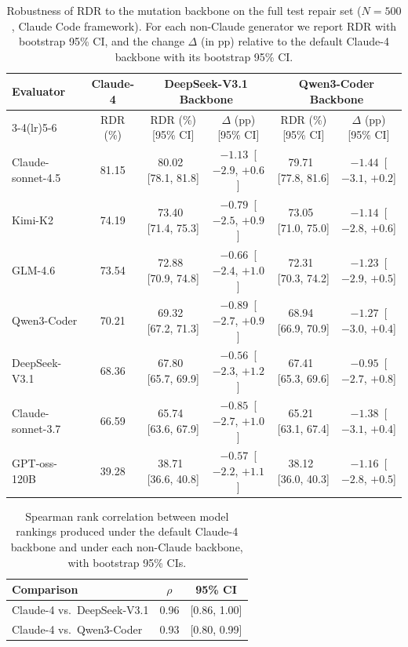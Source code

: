 \documentclass[11pt]{article}
\begin{document}
\begin{table}[h]
  \centering
  \small
  \renewcommand{\arraystretch}{1.15}
  \setlength{\tabcolsep}{5pt}
  \caption{
    Robustness of RDR to the mutation backbone on the full test repair set ($N{=}500$, Claude Code framework). For each non-Claude generator we report RDR with bootstrap 95\% CI, and the change $\Delta$ (in pp) relative to the default Claude-4 backbone with its bootstrap 95\% CI.
  }
  \begin{tabular}{l c cc cc}
    \toprule
    \multirow{2}{*}{Evaluator} & Claude-4 & \multicolumn{2}{c}{DeepSeek-V3.1 Backbone} & \multicolumn{2}{c}{Qwen3-Coder Backbone} \\
    \cmidrule(lr){3-4}\cmidrule(lr){5-6}
     & RDR (\%) & RDR (\%) [95\% CI] & $\Delta$ (pp) [95\% CI] & RDR (\%) [95\% CI] & $\Delta$ (pp) [95\% CI] \\
    \midrule
    Claude-sonnet-4.5 & 81.15 & 80.02 \,[78.1, 81.8] & $-1.13$ \,[$-2.9$, $+0.6$] & 79.71 \,[77.8, 81.6] & $-1.44$ \,[$-3.1$, $+0.2$] \\
    Kimi-K2           & 74.19 & 73.40 \,[71.4, 75.3] & $-0.79$ \,[$-2.5$, $+0.9$] & 73.05 \,[71.0, 75.0] & $-1.14$ \,[$-2.8$, $+0.6$] \\
    GLM-4.6           & 73.54 & 72.88 \,[70.9, 74.8] & $-0.66$ \,[$-2.4$, $+1.0$] & 72.31 \,[70.3, 74.2] & $-1.23$ \,[$-2.9$, $+0.5$] \\
    Qwen3-Coder       & 70.21 & 69.32 \,[67.2, 71.3] & $-0.89$ \,[$-2.7$, $+0.9$] & 68.94 \,[66.9, 70.9] & $-1.27$ \,[$-3.0$, $+0.4$] \\
    DeepSeek-V3.1     & 68.36 & 67.80 \,[65.7, 69.9] & $-0.56$ \,[$-2.3$, $+1.2$] & 67.41 \,[65.3, 69.6] & $-0.95$ \,[$-2.7$, $+0.8$] \\
    Claude-sonnet-3.7 & 66.59 & 65.74 \,[63.6, 67.9] & $-0.85$ \,[$-2.7$, $+1.0$] & 65.21 \,[63.1, 67.4] & $-1.38$ \,[$-3.1$, $+0.4$] \\
    GPT-oss-120B      & 39.28 & 38.71 \,[36.6, 40.8] & $-0.57$ \,[$-2.2$, $+1.1$] & 38.12 \,[36.0, 40.3] & $-1.16$ \,[$-2.8$, $+0.5$] \\
    \bottomrule
  \end{tabular}
  \label{tab:ablation_model}
\end{table}

\begin{table}[h]
  \centering
  \small
  \renewcommand{\arraystretch}{1.2}
  \setlength{\tabcolsep}{6pt}
  \caption{
    Spearman rank correlation between model rankings produced under the default Claude-4 backbone and under each non-Claude backbone, with bootstrap 95\% CIs.
  }
  \begin{tabular}{l cc}
    \toprule
    Comparison & $\rho$ & 95\% CI \\
    \midrule
    Claude-4 vs.\ DeepSeek-V3.1 & 0.96 & [0.86, 1.00] \\
    Claude-4 vs.\ Qwen3-Coder   & 0.93 & [0.80, 0.99] \\
    \bottomrule
  \end{tabular}
  \label{tab:ablation_model_spearman}
\end{table}
\end{document}
